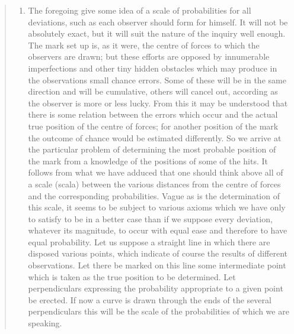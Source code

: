 \documentclass[
]{article}
\providecommand{\tightlist}{%
  \setlength{\itemsep}{0pt}\setlength{\parskip}{0pt}}
\begin{document}
\begin{quote}
\begin{enumerate}
\def\labelenumi{\arabic{enumi}.}
\setcounter{enumi}{5}
\tightlist
\item
  The foregoing give some idea of a scale of probabilities for all
  deviations, such as each observer should form for himself. It will not
  be absolutely exact, but it will suit the nature of the inquiry well
  enough. The mark set up is, as it were, the centre of forces to which
  the observers are drawn; but these efforts are opposed by innumerable
  imperfections and other tiny hidden obstacles which may produce in the
  observations small chance errors. Some of these will be in the same
  direction and will be cumulative, others will cancel out, according as
  the observer is more or less lucky. From this it may be understood
  that there is some relation between the errors which occur and the
  actual true position of the centre of forces; for another position of
  the mark the outcome of chance would be estimated differently. So we
  arrive at the particular problem of determining the most probable
  position of the mark from a knowledge of the positions of some of the
  hits. It follows from what we have adduced that one should think above
  all of a scale (scala) between the various distances from the centre
  of forces and the corresponding probabilities. Vague as is the
  determination of this scale, it seems to be subject to various axioms
  which we have only to satisfy to be in a better case than if we
  suppose every deviation, whatever its magnitude, to occur with equal
  ease and therefore to have equal probability. Let us suppose a
  straight line in which there are disposed various points, which
  indicate of course the results of different observations. Let there be
  marked on this line some intermediate point which is taken as the true
  position to be determined. Let perpendiculars expressing the
  probability appropriate to a given point be erected. If now a curve is
  drawn through the ends of the several perpendiculars this will be the
  scale of the probabilities of which we are speaking.
\end{enumerate}
\end{quote}
\end{document}
